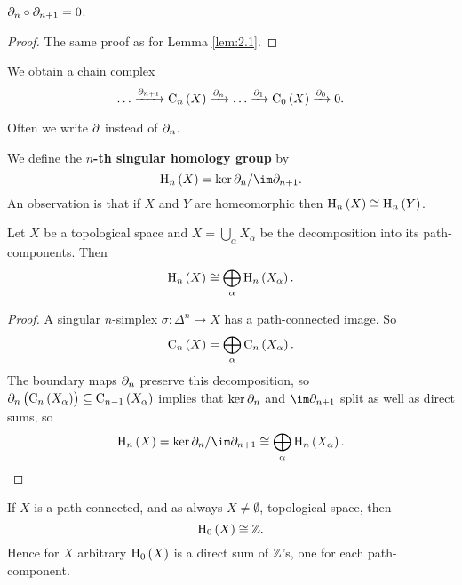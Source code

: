 \begin{lemma}
$ \partial_n \circ \partial_{n + 1} = 0 $.
\end{lemma}

\begin{proof}
The same proof as for Lemma \ref{lem:2.1}.
\end{proof}

We obtain a chain complex
$$ \dots \xrightarrow{\da_{n + 1}} \C_n\br{X} \xrightarrow{\da_n} \dots \xrightarrow{\da_1} \C_0\br{X} \xrightarrow{\da_0} 0. $$

\begin{remark*}
Often we write $ \partial $ instead of $ \partial_n $.
\end{remark*}

We define the \textbf{$ n $-th singular homology group} by
$$ \H_n\br{X} = \ker \da_n / \im \da_{n + 1}. $$
An observation is that if $ X $ and $ Y $ are homeomorphic then $ \H_n\br{X} \cong \H_n\br{Y} $.

\begin{proposition}
\label{prop:2.6}
Let $ X $ be a topological space and $ X = \bigcup_\alpha X_\alpha $ be the decomposition into its path-components. Then
$$ \H_n\br{X} \cong \bigoplus_\alpha \H_n\br{X_\alpha}. $$
\end{proposition}

\begin{proof}
A singular $ n $-simplex $ \sigma : \Delta^n \to X $ has a path-connected image. So
$$ \C_n\br{X} = \bigoplus_\alpha \C_n\br{X_\alpha}. $$
The boundary maps $ \partial_n $ preserve this decomposition, so $ \da_n\br{\C_n\br{X_\alpha}} \subseteq \C_{n - 1}\br{X_\alpha} $ implies that $ \ker \partial_n $ and $ \im \da_{n + 1} $ split as well as direct sums, so
$$ \H_n\br{X} = \ker \da_n / \im \da_{n + 1} \cong \bigoplus_\alpha \H_n\br{X_\alpha}. $$
\end{proof}

\begin{proposition}
\label{prop:2.7}
If $ X $ is a path-connected, and as always $ X \ne \emptyset $, topological space, then
$$ \H_0\br{X} \cong \ZZ. $$
Hence for $ X $ arbitrary $ \H_0\br{X} $ is a direct sum of $ \mathbb{Z} $'s, one for each path-component.
\end{proposition}

